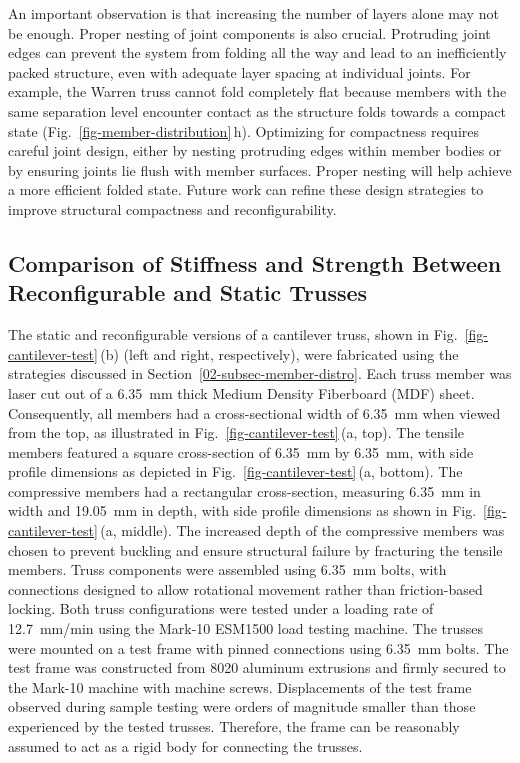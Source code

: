 An important observation is that increasing the number of layers alone may not be enough. Proper nesting of joint components is also crucial. Protruding joint edges can prevent the system from folding all the way and lead to an inefficiently packed structure, even with adequate layer spacing at individual joints. For example, the Warren truss cannot fold completely flat because members with the same separation level encounter contact as the structure folds towards a compact state (Fig.~\ref{fig-member-distribution}\,h). Optimizing for compactness requires careful joint design, either by nesting protruding edges within member bodies or by ensuring joints lie flush with member surfaces. Proper nesting will help achieve a more efficient folded state. Future work can refine these design strategies to improve structural compactness and reconfigurability.

\subsection{Comparison of Stiffness and Strength Between Reconfigurable and Static Trusses}\label{02-subsec-cantilever-truss}
The static and reconfigurable versions of a cantilever truss, shown in Fig.~\ref{fig-cantilever-test}\,(b) (left and right, respectively), were fabricated using the strategies discussed in Section~\ref{02-subsec-member-distro}. Each truss member was laser cut out of a 6.35~mm thick Medium Density Fiberboard (MDF) sheet. Consequently, all members had a cross-sectional width of 6.35~mm when viewed from the top, as illustrated in Fig.~\ref{fig-cantilever-test}\,(a, top). The tensile members featured a square cross-section of 6.35~mm by 6.35~mm, with side profile dimensions as depicted in Fig.~\ref{fig-cantilever-test}\,(a, bottom). The compressive members had a rectangular cross-section, measuring 6.35~mm in width and 19.05~mm in depth, with side profile dimensions as shown in Fig.~\ref{fig-cantilever-test}\,(a, middle). The increased depth of the compressive members was chosen to prevent buckling and ensure structural failure by fracturing the tensile members. Truss components were assembled using 6.35~mm bolts, with connections designed to allow rotational movement rather than friction-based locking. Both truss configurations were tested under a loading rate of 12.7~mm/min using the Mark-10 ESM1500 load testing machine. The trusses were mounted on a test frame with pinned connections using 6.35~mm bolts. The test frame was constructed from 80\textendash{}20 aluminum extrusions and firmly secured to the Mark-10 machine with machine screws. Displacements of the test frame observed during sample testing were orders of magnitude smaller than those experienced by the tested trusses. Therefore, the frame can be reasonably assumed to act as a rigid body for connecting the trusses.

